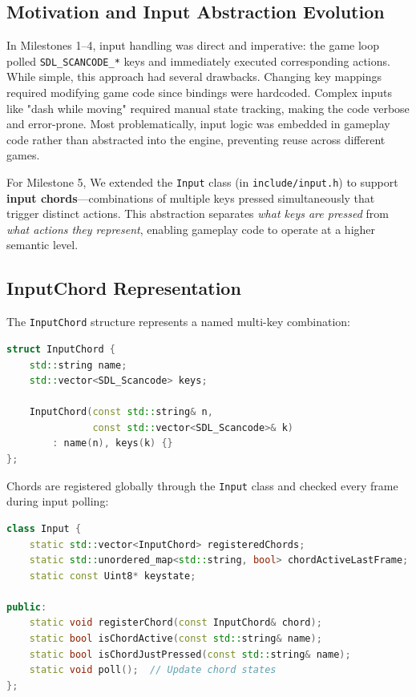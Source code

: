 \documentclass[12pt]{article}
\begin{document}
\subsection{Motivation and Input Abstraction Evolution}

In Milestones 1–4, input handling was direct and imperative: the game loop polled \texttt{SDL\_SCANCODE\_*} keys and immediately executed corresponding actions. While simple, this approach had several drawbacks. Changing key mappings required modifying game code since bindings were hardcoded. Complex inputs like "dash while moving" required manual state tracking, making the code verbose and error-prone. Most problematically, input logic was embedded in gameplay code rather than abstracted into the engine, preventing reuse across different games.

For Milestone 5, We extended the \texttt{Input} class (in \texttt{include/input.h}) to support \textbf{input chords}—combinations of multiple keys pressed simultaneously that trigger distinct actions. This abstraction separates \emph{what keys are pressed} from \emph{what actions they represent}, enabling gameplay code to operate at a higher semantic level.

\subsection{InputChord Representation}

The \texttt{InputChord} structure represents a named multi-key combination:

\begin{lstlisting}[language=C++]
struct InputChord {
    std::string name;
    std::vector<SDL_Scancode> keys;
    
    InputChord(const std::string& n, 
               const std::vector<SDL_Scancode>& k)
        : name(n), keys(k) {}
};
\end{lstlisting}

Chords are registered globally through the \texttt{Input} class and checked every frame during input polling:

\begin{lstlisting}[language=C++]
class Input {
    static std::vector<InputChord> registeredChords;
    static std::unordered_map<std::string, bool> chordActiveLastFrame;
    static const Uint8* keystate;
    
public:
    static void registerChord(const InputChord& chord);
    static bool isChordActive(const std::string& name);
    static bool isChordJustPressed(const std::string& name);
    static void poll();  // Update chord states
};
\end{lstlisting}
\end{document}
